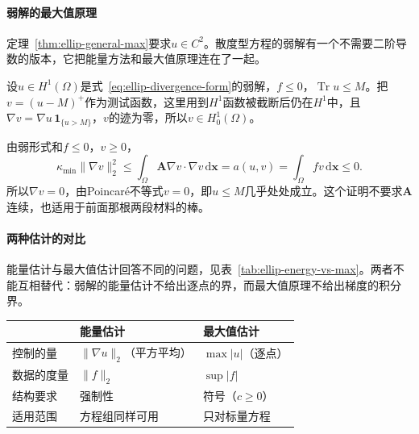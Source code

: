 \paragraph{弱解的最大值原理}
定理~\ref{thm:ellip-general-max}要求$u\in C^2$。散度型方程的弱解有一个不需要二阶导数的版本，它把能量方法和最大值原理连在了一起。

设$u\in H^1(\Omega)$是式~\eqref{eq:ellip-divergence-form}的弱解，$f\leq0$，$\operatorname{Tr}u\leq M$。把$v=(u-M)^+$作为测试函数，这里用到$H^1$函数被截断后仍在$H^1$中，且$\nabla v=\nabla u\,\mathbf{1}_{\{u>M\}}$，$v$的迹为零，所以$v\in H^1_0(\Omega)$。

由弱形式和$f\leq0$，$v\geq0$，
\[
 \kappa_{\min}\lVert\nabla v\rVert_2^2\leq\int_\Omega\bm{A}\nabla v\cdot\nabla v\,\mathrm{d}\bm{x}=a(u,v)=\int_\Omega fv\,\mathrm{d}\bm{x}\leq0 .
\]
所以$\nabla v=0$，由Poincaré不等式$v=0$，即$u\leq M$几乎处处成立。这个证明不要求$\bm{A}$连续，也适用于前面那根两段材料的棒。

\paragraph{两种估计的对比}
能量估计与最大值估计回答不同的问题，见表~\ref{tab:ellip-energy-vs-max}。两者不能互相替代：弱解的能量估计不给出逐点的界，而最大值原理不给出梯度的积分界。

\begin{BookInlineTable}
  \centering
  \caption{能量估计与最大值估计的对比。}
  \label{tab:ellip-energy-vs-max}
  \begin{tabular}{lll}
    \toprule
    & 能量估计 & 最大值估计\\
    \midrule
    控制的量 & $\lVert\nabla u\rVert_2$（平方平均） & $\max\lvert u\rvert$（逐点）\\
    数据的度量 & $\lVert f\rVert_2$ & $\sup\lvert f\rvert$\\
    结构要求 & 强制性 & 符号（$c\geq0$）\\
    适用范围 & 方程组同样可用 & 只对标量方程\\
    \bottomrule
  \end{tabular}
\end{BookInlineTable}
